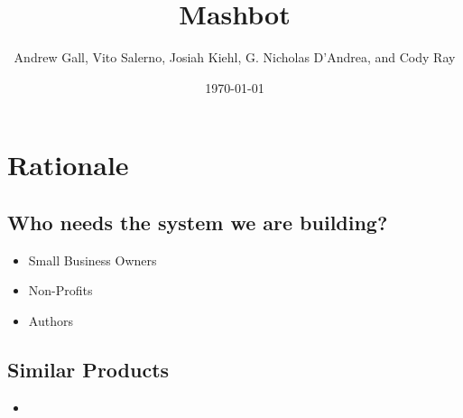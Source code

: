 \documentclass{beamer}
\begin{document}
	\title{Mashbot}
	\author{Andrew Gall, Vito Salerno, Josiah Kiehl, G. Nicholas D'Andrea, and Cody Ray}
	\date{\today}

	\frame{\titlepage}
	

	\section{Rationale}
		\subsection{Who needs the system we are building?}
				\begin{itemize}
					\item Small Business Owners
					\item Non-Profits
					\item Authors
				\end{itemize}	

		\subsection{Similar Products}
				\begin{itemize}
					\item
				\end{itemize}
					
			
		
	
\end{document}
